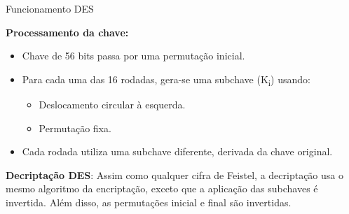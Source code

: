\begin{frame}{Funcionamento DES}




    \vspace{0.3cm}
    \textbf{Processamento da chave:}
    \begin{itemize}
        \item Chave de 56 bits passa por uma permutação inicial.
        \item Para cada uma das 16 rodadas, gera-se uma subchave (K\textsubscript{i}) usando:
              \begin{itemize}
                  \item Deslocamento circular à esquerda.
                  \item Permutação fixa.
              \end{itemize}
        \item Cada rodada utiliza uma subchave diferente, derivada da chave original.
    \end{itemize}

    \textbf{Decriptação DES}:
    Assim como qualquer cifra de Feistel, a decriptação usa o mesmo algoritmo da encriptação, exceto que a
    aplicação das subchaves é invertida. Além disso, as permutações inicial e final são invertidas.
\end{frame}

